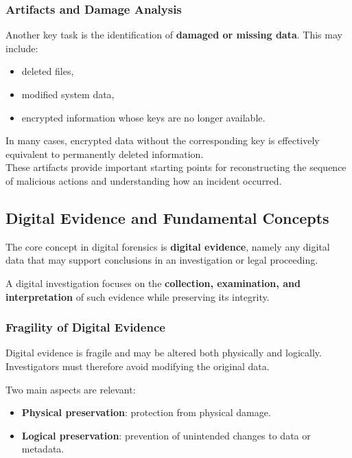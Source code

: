 \subsubsection*{Artifacts and Damage Analysis}

Another key task is the identification of \textbf{damaged or missing data}. This may include:

\begin{itemize}
\item deleted files,
\item modified system data,
\item encrypted information whose keys are no longer available.
\end{itemize}
\noindent
In many cases, encrypted data without the corresponding key is effectively equivalent to permanently deleted information.
\\
These artifacts provide important starting points for reconstructing the sequence of malicious actions and understanding how an incident occurred.

\subsection{Digital Evidence and Fundamental Concepts}

The core concept in digital forensics is \textbf{digital evidence}, namely any digital data that may support conclusions in an investigation or legal proceeding.

\medskip
\noindent
A digital investigation focuses on the \textbf{collection, examination, and interpretation} of such evidence while preserving its integrity.

\subsubsection{Fragility of Digital Evidence}

Digital evidence is fragile and may be altered both physically and logically. Investigators must therefore avoid modifying the original data.

\noindent
Two main aspects are relevant:

\begin{itemize}
\item \textbf{Physical preservation}: protection from physical damage.
\item \textbf{Logical preservation}: prevention of unintended changes to data or metadata.
\end{itemize}

